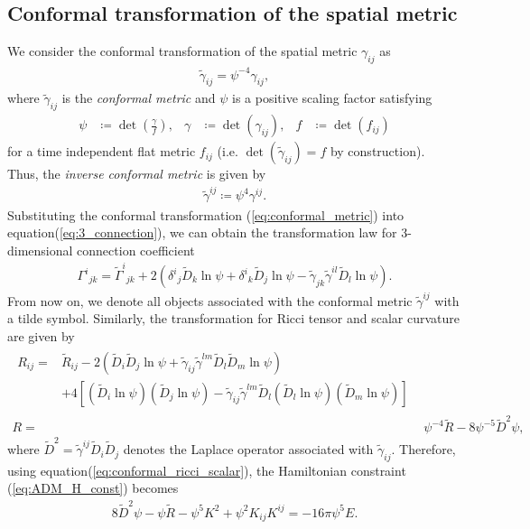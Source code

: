 \subsection{Conformal transformation of the spatial metric}
\label{section1.3.1}
We consider the conformal transformation of the spatial metric $\gamma_{ij}$ as
\begin{align}\label{eq:conformal_metric}
    \tilde{\gamma}_{ij} = \psi^{-4} \gamma_{ij},
\end{align}
where $\tilde{\gamma}_{ij}$ is the \textit{conformal metric} and $\psi$ is a positive scaling factor satisfying
\begin{align}\label{eq:scaling_factor}
    \psi &\coloneqq \det{\left( \frac{\gamma}{f} \right)}, & \gamma &\coloneqq \det{\left( \gamma_{ij} \right)}, & f &\coloneqq \det{\left( f_{ij} \right)}
\end{align}
for a time independent flat metric $f_{ij}$ (i.e. $\det{\left( \tilde{\gamma}_{ij} \right)} = f$ by construction).\\
Thus, the \textit{inverse conformal metric} is given by
\begin{align}\label{eq:conformal_metric_inv}
    \tilde{\gamma}^{ij} \coloneqq \psi^4 \gamma^{ij}.
\end{align}
Substituting the conformal transformation (\ref{eq:conformal_metric}) into equation(\ref{eq:3_connection}),
we can obtain the transformation law for 3-dimensional connection coefficient
\begin{align}
    \Gamma^{i}{}_{jk} = \tilde{\Gamma}^{i}{}_{jk} + 2 \left( \delta^i{}_j \tilde{D}_k \ln \psi + \delta^i{}_k \tilde{D}_j \ln \psi
    - \tilde{\gamma}_{jk} \tilde{\gamma}^{il} \tilde{D}_l \ln \psi \right).
\end{align}
From now on, we denote all objects associated with the conformal metric $\tilde{\gamma}^{ij}$ with a tilde symbol.
Similarly, the transformation for Ricci tensor and scalar curvature are given by
\begin{align}
\begin{split}
    R_{ij} =& \tilde{R}_{ij} - 2 \left( \tilde{D}_i \tilde{D}_j \ln \psi + \tilde{\gamma}_{ij} \tilde{\gamma}^{lm} \tilde{D}_l \tilde{D}_m \ln \psi \right)\\
    &+ 4 \left[ \left(\tilde{D}_i \ln \psi \right) \left( \tilde{D}_j \ln \psi \right) 
    - \tilde{\gamma}_{ij} \tilde{\gamma}^{lm} \tilde{D}_l \left(\tilde{D}_l \ln \psi \right) \left( \tilde{D}_m \ln \psi \right) \right]
\end{split} \label{eq:conformal_ricci_tensor}\\
    R =& \psi^{-4} \tilde{R} - 8 \psi^{-5} \tilde{D}^2 \psi, \label{eq:conformal_ricci_scalar}
\end{align}
where $\tilde{D}^2 = \tilde{\gamma}^{ij} \tilde{D}_i \tilde{D}_j$ denotes the Laplace operator associated with $\tilde{\gamma}_{ij}$.
Therefore, using equation(\ref{eq:conformal_ricci_scalar}), the Hamiltonian constraint (\ref{eq:ADM_H_const}) becomes
\begin{align}
    8 \tilde{D}^2 \psi - \psi \tilde{R} - \psi^5 K^2 + \psi^2 K_{ij} K^{ij} = - 16 \pi \psi^5 E.
\end{align}

